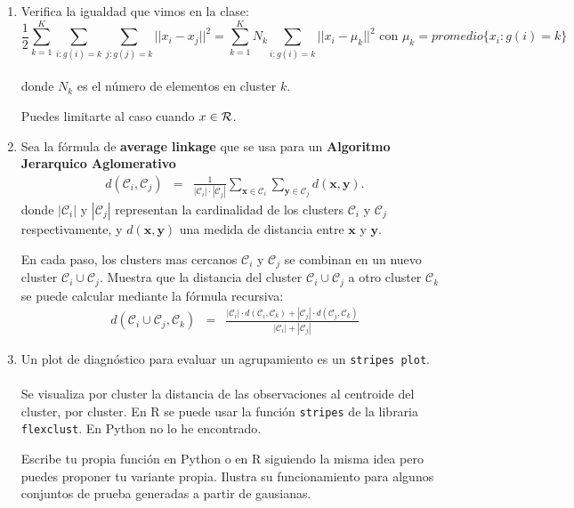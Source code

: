 \documentclass[12pt]{book}
\newcommand {\?}{?`}
\begin{document}
\begin{enumerate}
\item
Verifica la igualdad que vimos en la clase:
\begin{equation}
 \frac{1}{2} \sum_{k=1}^K  \sum_{i: g(i)=k}  \sum_{j: g(j)=k}   ||x_i - x_j||^2  = 
 \sum_{k=1}^K N_k  \sum_{i: g(i)=k}   ||x_i - \mu_k||^2 \mbox{ con } \mu_k= promedio \{x_i: g(i)=k\}
\end{equation} \mbox{} \\
donde $N_k$ es el n\'umero de elementos en cluster $k$. 

Puedes limitarte al caso cuando $x\in {\cal R}$. 


\item
Sea la f\'ormula  de \textbf{average linkage} que se usa para un \textbf{Algoritmo Jerarquico Aglomerativo}
\begin{eqnarray*}
d(\mathcal{C}_i, \mathcal{C}_j) &=&  {\displaystyle {\frac {1}{|\mathcal{C}_i|\cdot |\mathcal{C}_j|}}\sum _{\mathbf{x}\in \mathcal{C}_i}\sum _{\mathbf{y}\in \mathcal{C}_j}d(\mathbf{x},\mathbf{y}).}
\end{eqnarray*}
donde $|\mathcal{C}_i|$ y  $|\mathcal{C}_j|$ representan la cardinalidad de los clusters $\mathcal{C}_i$ y $\mathcal{C}_j$ respectivamente, y $d(\mathbf{x},\mathbf{y})$ una medida de distancia entre $\mathbf{x}$ y $\mathbf{y}$. 

En cada paso, los clusters mas cercanos $\mathcal{C}_i$ y $\mathcal{C}_j$ se combinan   en un nuevo cluster $\mathcal{C}_i\cup \mathcal{C}_j$.
Muestra que la distancia del  cluster $\mathcal{C}_i\cup \mathcal{C}_j$ a otro cluster $\mathcal{C}_k$ se puede calcular mediante la f\'ormula recursiva:
\begin{eqnarray*}
d(\mathcal{C}_i\cup \mathcal{C}_j,\mathcal{C}_k) &=&{\frac {|\mathcal{C}_i|\cdot d({\mathcal{C}_i},\mathcal{C}_k)+|{\mathcal{C}_j}|\cdot d(\mathcal{C}_j,\mathcal{C}_k)}{|{\mathcal{C}_i}|+|\mathcal{C}_j|}}
\end{eqnarray*}

\item 
Un plot de diagn\'ostico para evaluar un agrupamiento es un {\tt stripes plot}. \\
 \\
Se visualiza por cluster la distancia de las observaciones al centroide del cluster, por cluster. En {\cal R} se puede usar la funci\'on \verb|stripes| de la libraria \verb|flexclust|. En Python no lo he encontrado.

Escribe tu propia funci\'on en Python o en {\cal R} siguiendo la misma idea pero puedes proponer tu variante propia. 
Ilustra su funcionamiento para algunos conjuntos de prueba generadas a partir de gausianas.


\end{enumerate}
\end{document}
